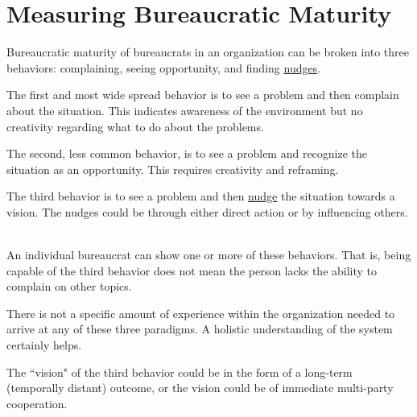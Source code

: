 \section{Measuring Bureaucratic Maturity}

Bureaucratic maturity of bureaucrats in an organization can be broken into three behaviors: complaining, seeing opportunity, and finding 
\href{https://en.wikipedia.org/wiki/Nudge_theory}{nudges}.

The first and most wide spread behavior is to see a problem and then complain about the situation. This indicates awareness of the environment but no creativity regarding what to do about the problems.

The second, less common behavior, is to see a problem and recognize the situation as an opportunity. This requires creativity and reframing. 

The third behavior is to see a problem and then \href{https://en.wikipedia.org/wiki/Nudge_theory}{nudge} 
the situation towards a vision. The nudges could be through either direct action or by influencing others. 


\ \\

An individual bureaucrat can show one or more of these behaviors. That is, being capable of the third behavior does not mean the person lacks the ability to complain on other topics. 

There is not a specific amount of experience within the organization needed to arrive at any of these three paradigms. A holistic understanding of the system certainly helps.

The ``vision" of the third behavior could be in the form of a long-term (temporally distant) outcome, or the vision could be of immediate multi-party cooperation. 